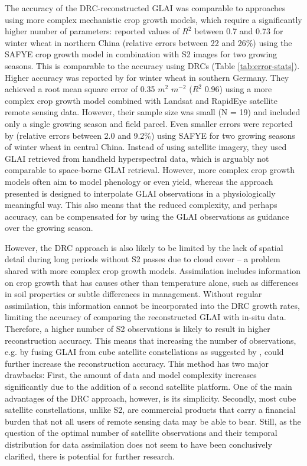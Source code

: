 The accuracy of the \gls{DRC}-reconstructed \gls{GLAI} was comparable to approaches using more complex mechanistic crop growth models, which require a significantly higher number of parameters: \cite{ma_wheat_2022} reported values of $R^2$ between 0.7 and 0.73 for winter wheat in northern China (relative errors between 22 and 26\%) using the SAFYE crop growth model in combination with \gls{S2} images for two growing seasons. This is comparable to the accuracy using \gls{DRC}s (Table \ref{tab:error-stats}). Higher accuracy was reported by \cite{hank_using_2015} for winter wheat in southern Germany. They achieved a root mean square error of 0.35 $m^2$ $m^{-2}$ ($R^2$ 0.96) using a more complex crop growth model combined with Landsat and RapidEye satellite remote sensing data. However, their sample size was small (N = 19) and included only a single growing season and field parcel. Even smaller errors were reported by \cite{zhang_improving_2021} (relative errors between 2.0 and 9.2\%) using SAFYE for two growing seasons of winter wheat in central China. Instead of using satellite imagery, they used \gls{GLAI} retrieved from handheld hyperspectral data, which is arguably not comparable to space-borne \gls{GLAI} retrieval. However, more complex crop growth models often aim to model phenology or even yield, whereas the approach presented is designed to interpolate \gls{GLAI} observations in a physiologically meaningful way. This also means that the reduced complexity, and perhaps accuracy, can be compensated for by using the \gls{GLAI} observations as guidance over the growing season.

However, the \gls{DRC} approach is also likely to be limited by the lack of spatial detail during long periods without \gls{S2} passes due to cloud cover -- a problem shared with more complex crop growth models. Assimilation includes information on crop growth that has causes other than temperature alone, such as differences in soil properties or subtle differences in management. Without regular assimilation, this information cannot be incorporated into the \gls{DRC} growth rates, limiting the accuracy of comparing the reconstructed \gls{GLAI} with in-situ data. Therefore, a higher number of \gls{S2} observations is likely to result in higher reconstruction accuracy. This means that increasing the number of observations, e.g. by fusing \gls{GLAI} from cube satellite constellations as suggested by \cite{sadeh_fusion_2021}, could further increase the reconstruction accuracy. This method has two major drawbacks: First, the amount of data and model complexity increases significantly due to the addition of a second satellite platform. One of the main advantages of the \gls{DRC} approach, however, is its simplicity. Secondly, most cube satellite constellations, unlike \gls{S2}, are commercial products that carry a financial burden that not all users of remote sensing data may be able to bear. Still, as the question of the optimal number of satellite observations and their temporal distribution for data assimilation does not seem to have been conclusively clarified, there is potential for further research.

